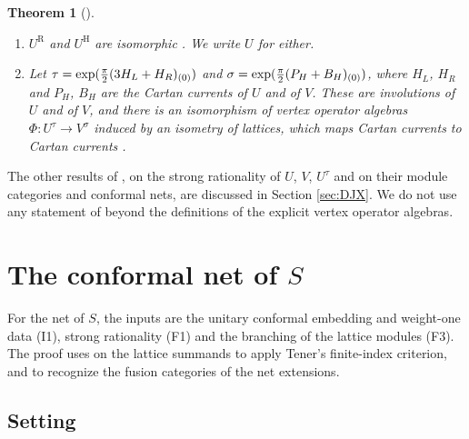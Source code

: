 \documentclass[leqno]{article}
\newcommand{\co}{\colon}
\let\i\relax
\newcommand{\i}{\mathrm{i}}
\newtheorem{thm}{Theorem}[section]
\numberwithin{equation}{section}
\begin{document}
\begin{thm}[{\cite{DJX26}}]
\label{thm:inputs-DJX}
\begin{enumerate}
\item[\textup{(D1)}] $U^{\mathrm R}$ and $U^{\mathrm H}$ are isomorphic \cite[Section 4.5 and Proposition 4.1]{DJX26}. We write $U$ for either.
\item[\textup{(D2)}] Let $\tau = \exp(\frac{\pi\i}{2}(3H_L+H_R)_{(0)})$ and $\sigma = \exp(\frac{\pi\i}{2}(P_H+B_H)_{(0)})$, where $H_L$, $H_R$ and $P_H$, $B_H$ are the Cartan currents of $U$ and of $V$. These are involutions of $U$ and of $V$, and there is an isomorphism of vertex operator algebras $\Phi \co U^\tau \to V^\sigma$ induced by an isometry of lattices, which maps Cartan currents to Cartan currents \cite[Theorem 7.3]{DJX26}.
\end{enumerate}
\end{thm}

The other results of \cite{DJX26}, on the strong rationality of $U$, $V$, $U^\tau$ and on their module categories and conformal nets, are discussed in Section \ref{sec:DJX}. We do not use any statement of \cite{Jia26,Rie26,Hua26} beyond the definitions of the explicit vertex operator algebras.


\section{The conformal net of \texorpdfstring{$S$}{S}}
\label{sec:net}

For the net of $S$, the inputs are the unitary conformal embedding and weight-one data (I1), strong rationality (F1) and the branching of the lattice modules (F3). The proof uses \cite[Proposition 5.2]{ArhII} on the lattice summands to apply Tener's finite-index criterion, and \cite[Theorem 6.1]{ArhII} to recognize the fusion categories of the net extensions.


\subsection{Setting}
\label{subsec:net-setting}
\end{document}
